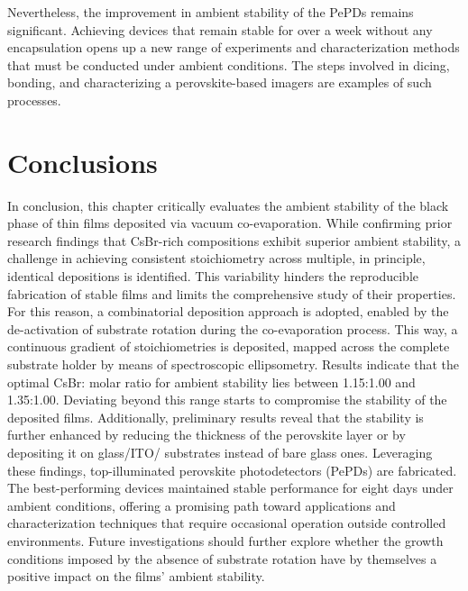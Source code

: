 Nevertheless, the improvement in ambient stability of the PePDs remains significant. Achieving devices that remain stable for over a week without any encapsulation opens up a new range of experiments and characterization methods that must be conducted under ambient conditions. The steps involved in dicing, bonding, and characterizing a perovskite-based imagers are examples of such processes.

\section{Conclusions}

In conclusion, this chapter critically evaluates the ambient stability of the black phase of  thin films deposited via vacuum co-evaporation. While confirming prior research findings that CsBr-rich compositions exhibit superior ambient stability, a challenge in achieving consistent stoichiometry across multiple, in principle, identical depositions is identified. This variability hinders the reproducible fabrication of stable films and limits the comprehensive study of their properties. For this reason, a combinatorial deposition approach is adopted, enabled by the de-activation of substrate rotation during the co-evaporation process. This way, a continuous gradient of stoichiometries is deposited, mapped across the complete substrate holder by means of spectroscopic ellipsometry. Results indicate that the optimal CsBr: molar ratio for ambient stability lies between 1.15:1.00 and 1.35:1.00. Deviating beyond this range starts to compromise the stability of the deposited films. Additionally, preliminary results reveal that the stability is further enhanced by reducing the thickness of the perovskite layer or by depositing it on glass/ITO/ substrates instead of bare glass ones. Leveraging these findings, top-illuminated perovskite photodetectors (PePDs) are fabricated. The best-performing devices maintained stable performance for eight days under ambient conditions, offering a promising path toward applications and characterization techniques that require occasional operation outside controlled environments. Future investigations should further explore whether the growth conditions imposed by the absence of substrate rotation have by themselves a positive impact on the films' ambient stability. 

\cleardoublepage

